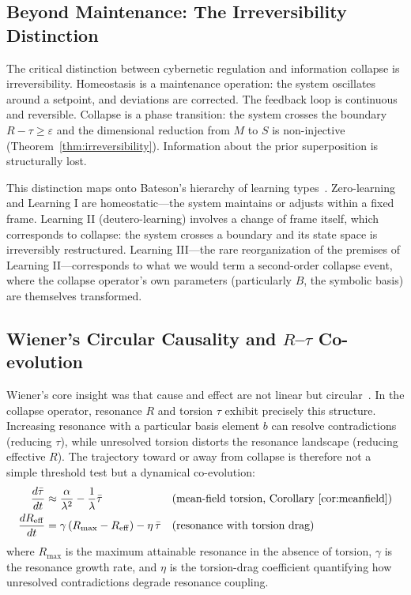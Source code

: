 \documentclass[11pt]{article}
\theoremstyle{plain}
\begin{document}
\subsection{Beyond Maintenance: The Irreversibility Distinction}

The critical distinction between cybernetic regulation and information collapse is
irreversibility. Homeostasis is a maintenance operation: the system oscillates around a setpoint,
and deviations are corrected. The feedback loop is continuous and reversible. Collapse is a phase
transition: the system crosses the boundary $R - \tau \geq \varepsilon$ and the dimensional
reduction from $M$ to $S$ is non-injective (Theorem~\ref{thm:irreversibility}). Information about
the prior superposition is structurally lost.

This distinction maps onto Bateson's hierarchy of learning types~\cite{bateson1972}.
Zero-learning and Learning I are homeostatic---the system maintains or adjusts within a fixed
frame. Learning II (deutero-learning) involves a change of frame itself, which corresponds to
collapse: the system crosses a boundary and its state space is irreversibly restructured. Learning
III---the rare reorganization of the premises of Learning II---corresponds to what we would term a
second-order collapse event, where the collapse operator's own parameters (particularly $B$, the
symbolic basis) are themselves transformed.

\subsection{Wiener's Circular Causality and \texorpdfstring{$R$--$\tau$}{R-tau} Co-evolution}

Wiener's core insight was that cause and effect are not linear but circular~\cite{wiener1948}. In
the collapse operator, resonance $R$ and torsion $\tau$ exhibit precisely this structure.
Increasing resonance with a particular basis element $b$ can resolve contradictions (reducing
$\tau$), while unresolved torsion distorts the resonance landscape (reducing effective $R$). The
trajectory toward or away from collapse is therefore not a simple threshold test but a dynamical
co-evolution:
\begin{align}
  \frac{d\bar\tau}{dt} &\approx \frac{\alpha}{\lambda^2} - \frac{1}{\lambda}\bar\tau
    && \text{(mean-field torsion, Corollary~\ref{cor:meanfield})} \label{eq:coevo-tau} \\
  \frac{dR_{\mathrm{eff}}}{dt} &= \gamma\,(R_{\max} - R_{\mathrm{eff}}) - \eta\,\bar\tau
    && \text{(resonance with torsion drag)} \label{eq:coevo-R}
\end{align}
where $R_{\max}$ is the maximum attainable resonance in the absence of torsion, $\gamma$ is the
resonance growth rate, and $\eta$ is the torsion-drag coefficient quantifying how unresolved
contradictions degrade resonance coupling.
\end{document}
